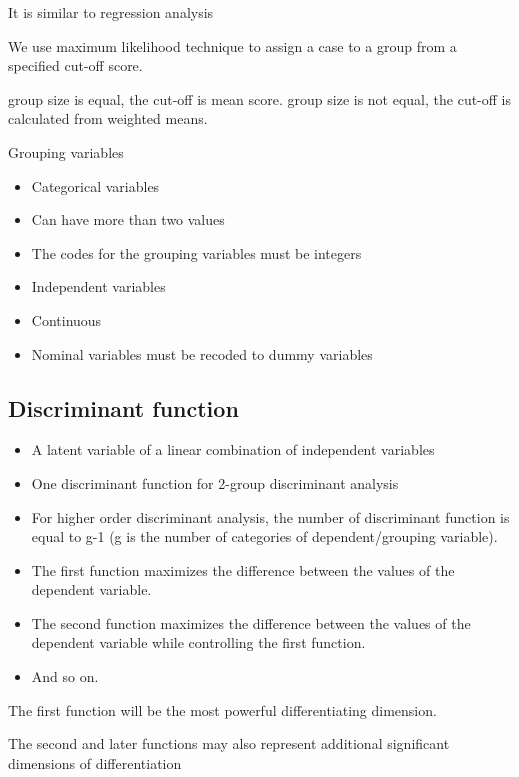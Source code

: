 It is similar to regression analysis

We use maximum likelihood technique to assign a case to a group from a specified cut-off score.
\begin{itemize}
\itemIf group size is equal, the cut-off is mean score.
\itemIf group size is not equal, the cut-off is calculated from weighted means.
\end{itemize}

Grouping variables
\begin{itemize}
\item Categorical variables
\item Can have more than two values
\item The codes for the grouping variables must be integers
\item Independent variables
\item Continuous
\item Nominal variables must be recoded to dummy variables
\end{itemize}

\subsection{Discriminant function}
\begin{itemize}
\item A latent variable of a linear combination of independent variables
\item One discriminant function for 2-group discriminant analysis
\item For higher order discriminant analysis, the number of discriminant function is equal to g-1 (g is the number of categories of dependent/grouping variable).
\item The first function maximizes the difference between the values of the dependent variable.
\item The second function maximizes the difference between the values of the dependent variable while controlling the first function.
\item And so on.
\end{itemize}
The first function will be the most powerful differentiating dimension.
\item The second and later functions may also represent additional significant dimensions of differentiation


